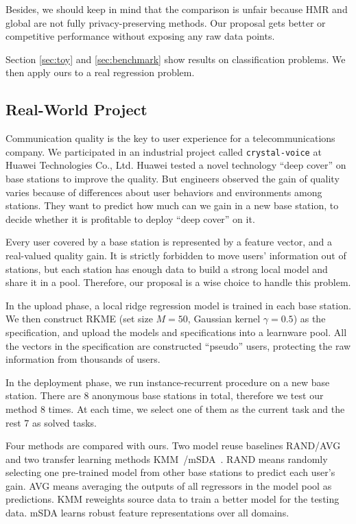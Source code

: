 \documentclass[paper=letter, fontsize=20pt]{article}
\begin{document}
Besides, we should keep in mind that the comparison is unfair because HMR and global are not fully privacy-preserving methods. Our proposal gets better or competitive performance without exposing any raw data points.

Section \ref{sec:toy} and \ref{sec:benchmark} show results on classification problems. We then apply ours to a real regression problem. 
\subsection{Real-World Project}
Communication quality is the key to user experience for a telecommunications company. We participated in an industrial project called \texttt{crystal-voice} at Huawei Technologies Co., Ltd. Huawei tested a novel technology ``deep cover'' on base stations to improve the quality. But engineers observed the gain of quality varies because of differences about user behaviors and environments among stations. They want to predict how much can we gain in a new base station, to decide whether it is profitable to deploy ``deep cover'' on it.

Every user covered by a base station is represented by a feature vector, and a real-valued quality gain. It is strictly forbidden to move users' information out of stations, but each station has enough data to build a strong local model and share it in a pool. Therefore, our proposal is a wise choice to handle this problem.

In the upload phase, a local ridge regression model is trained in each base station. We then construct RKME (set size $M=50$, Gaussian kernel $\gamma=0.5$) as the specification, and upload the models and specifications into a learnware pool. All the vectors in the specification are constructed ``pseudo'' users, protecting the raw information from thousands of users. 

In the deployment phase, we run instance-recurrent procedure on a new base station. There are 8 anonymous base stations in total, therefore we test our method 8 times. At each time, we select one of them as the current task and the rest 7 as solved tasks. 

Four methods are compared with ours. Two model reuse baselines RAND/AVG and two transfer learning methods KMM~\citep{KMM}/mSDA~\citep{MSDA}. RAND means randomly selecting one pre-trained model from other base stations to predict each user's gain. AVG means averaging the outputs of all regressors in the model pool as predictions. KMM reweights source data to train a better model for the testing data. mSDA learns robust feature representations over all domains.
\end{document}
